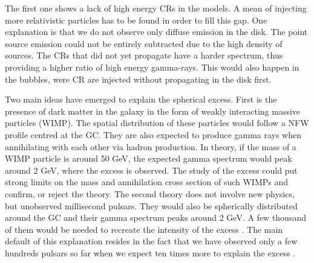 The first one shows a lack of high energy CRs in the models. A mean of injecting more relativistic particles has to be found in order to fill this gap. One explanation is that we do not observe only diffuse emission in the disk. The point source emission could not be entirely subtracted due to the high density of sources. The CRs that did not yet propagate have a harder spectrum, thus providing a higher ratio of high energy gamma-rays. This would also happen in the bubbles, were CR are injected without propagating in the disk first.

Two main ideas have emerged to explain the spherical excess.
First is the presence of dark matter in the galaxy in the form of weakly interacting massive particles (WIMP). The spatial distribution of these particles would follow a NFW profile centred at the GC. They are also expected to produce gamma rays when annihilating with each other via hadron production. In theory, if the mass of a WIMP particle is around 50 GeV, the expected gamma spectrum would peak around 2 GeV, where the excess is observed. 
The study of the excess could put strong limits on the mass and annihilation cross section of such WIMPs and confirm, or reject the theory.
The second theory does not involve new physics, but unobserved millisecond pulsars. They would also be spherically distributed around the GC and their gamma spectrum peaks around 2 GeV. A few thousand of them would be needed to recreate the intensity of the excess . The main default of this explanation resides in the fact that we have observed only a few hundreds pulsars so far when we expect ten times more to explain the excess .















